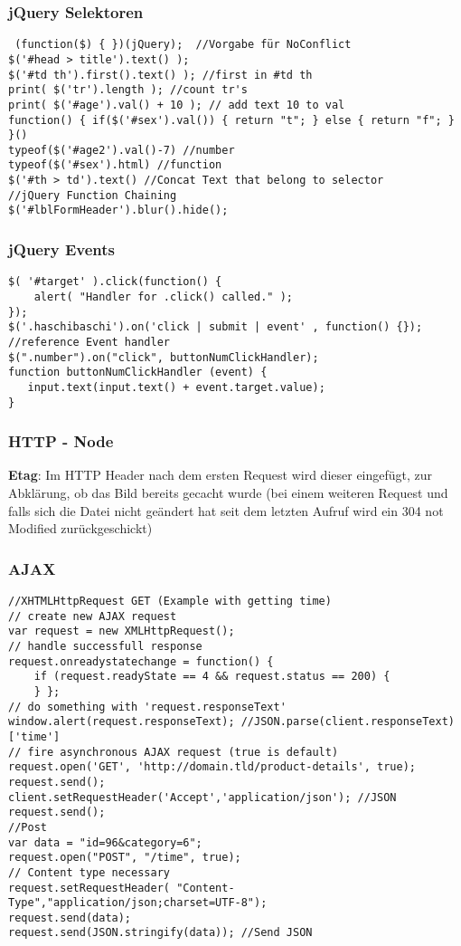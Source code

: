 \begin{multicols*}{4}
\subsubsection{jQuery Selektoren}

 \begin{verbatim}
 (function($) { })(jQuery);  //Vorgabe für NoConflict
$('#head > title').text() );
$('#td th').first().text() ); //first in #td th
print( $('tr').length ); //count tr's
print( $('#age').val() + 10 ); // add text 10 to val
function() { if($('#sex').val()) { return "t"; } else { return "f"; } }()
typeof($('#age2').val()-7) //number
typeof($('#sex').html) //function
$('#th > td').text() //Concat Text that belong to selector
//jQuery Function Chaining
$('#lblFormHeader').blur().hide();
 \end{verbatim}
 
 \subsubsection{jQuery Events}
  \begin{verbatim}
$( '#target' ).click(function() {
    alert( "Handler for .click() called." );
});
$('.haschibaschi').on('click | submit | event' , function() {});
//reference Event handler
$(".number").on("click", buttonNumClickHandler);
function buttonNumClickHandler (event) {
   input.text(input.text() + event.target.value);
}
\end{verbatim}

\subsubsection{HTTP - Node}
\textbf{Etag}: Im HTTP Header nach dem ersten Request wird dieser eingefügt, zur 
Abklärung, ob das Bild bereits gecacht wurde 
(bei einem weiteren Request und falls sich die Datei nicht geändert hat seit dem letzten 
Aufruf wird ein 304 not Modified zurückgeschickt)

\subsubsection{AJAX}
\begin{verbatim}
//XHTMLHttpRequest GET (Example with getting time)
// create new AJAX request
var request = new XMLHttpRequest();
// handle successfull response
request.onreadystatechange = function() {
    if (request.readyState == 4 && request.status == 200) {
    } };
// do something with 'request.responseText'
window.alert(request.responseText); //JSON.parse(client.responseText)['time']
// fire asynchronous AJAX request (true is default)
request.open('GET', 'http://domain.tld/product-details', true); 
request.send();
client.setRequestHeader('Accept','application/json'); //JSON
request.send();
//Post
var data = "id=96&category=6";
request.open("POST", "/time", true);
// Content type necessary
request.setRequestHeader( "Content-Type","application/json;charset=UTF-8"); 
request.send(data);
request.send(JSON.stringify(data)); //Send JSON
 \end{verbatim}
 

\end{multicols*}

